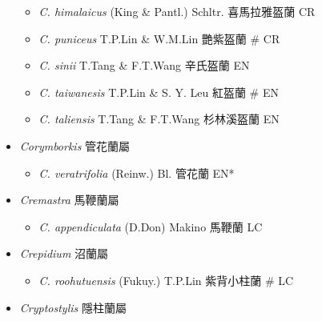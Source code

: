 \begin{itemize}
  \begin{itemize}
        \item[] \textit{C. himalaicus} (King \& Pantl.) Schltr.  喜馬拉雅盔蘭   CR
        \item[] \textit{C. puniceus} T.P.Lin \& W.M.Lin  艷紫盔蘭  \# CR
        \item[] \textit{C. sinii} T.Tang \& F.T.Wang  辛氏盔蘭   EN
        \item[] \textit{C. taiwanesis} T.P.Lin \& S. Y. Leu  紅盔蘭  \# EN
        \item[] \textit{C. taliensis} T.Tang \& F.T.Wang  杉林溪盔蘭   EN
  \end{itemize}
 \item[] \textit{Corymborkis} 管花蘭屬
                                
  \begin{itemize}
        \item[] \textit{C. veratrifolia} (Reinw.) Bl.  管花蘭   EN*
  \end{itemize}
 \item[] \textit{Cremastra} 馬鞭蘭屬
                                
  \begin{itemize}
        \item[] \textit{C. appendiculata} (D.Don) Makino  馬鞭蘭   LC
  \end{itemize}
 \item[] \textit{Crepidium} 沼蘭屬
                                
  \begin{itemize}
        \item[] \textit{C. roohutuensis} (Fukuy.) T.P.Lin  紫背小柱蘭  \# LC
  \end{itemize}
 \item[] \textit{Cryptostylis} 隱柱蘭屬
                                

\end{itemize}
